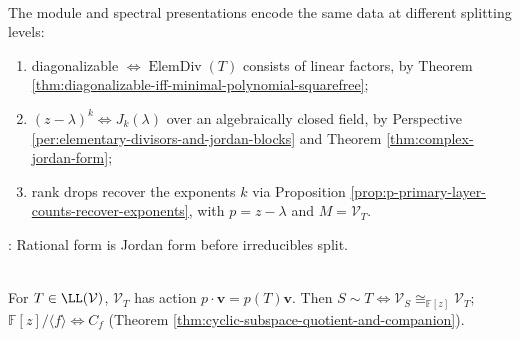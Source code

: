 \begin{perspective} \label{per:module-and-spectral-canonical-form-crosswalk} \\
The module and spectral presentations encode the same data at different splitting levels:
\begin{enumerate}[label=(\roman*)]
\setlength{\itemsep}{0pt}
\item diagonalizable $\Longleftrightarrow \operatorname{ElemDiv}(T)$ consists of linear factors, by Theorem \ref{thm:diagonalizable-iff-minimal-polynomial-squarefree};
\item $(z-\lambda)^k\Longleftrightarrow J_k(\lambda)$ over an algebraically closed field, by Perspective \ref{per:elementary-divisors-and-jordan-blocks} and Theorem \ref{thm:complex-jordan-form};
\item rank drops recover the exponents $k$ via Proposition \ref{prop:p-primary-layer-counts-recover-exponents}, with $p=z-\lambda$ and $M=\mathcal{V}_T$.
\end{enumerate}
: Rational form is Jordan form before irreducibles split.
\end{perspective}

\begin{perspective} \label{per:operator-module-similarity-dictionary} \\
For $T\in\LL(\mathcal{V})$, $\mathcal{V}_T$ has action $p\cdot\mathbf{v}=p(T)\mathbf{v}$. Then $S\sim T\Longleftrightarrow\mathcal{V}_S\cong_{\mathbb{F}[z]}\mathcal{V}_T$; $\mathbb{F}[z]/\langle f\rangle\Longleftrightarrow C_f$ (Theorem \ref{thm:cyclic-subspace-quotient-and-companion}).
\end{perspective}

